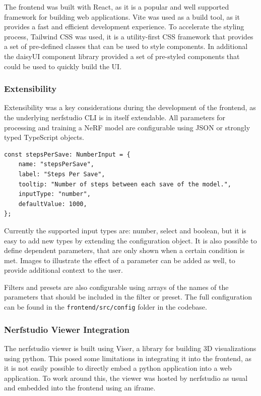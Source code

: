 The frontend was built with React, as it is a popular and well supported framework for building web applications.
Vite was used as a build tool, as it provides a fast and efficient development experience.
To accelerate the styling process, Tailwind CSS was used, it is a utility-first CSS framework that provides a set of pre-defined classes that can be used to style components.
In additional the daisyUI component library provided a set of pre-styled components that could be used to quickly build the UI.

\subsubsection{Extensibility}

Extensibility was a key considerations during the development of the frontend, as the underlying nerfstudio CLI is in itself extendable.
All parameters for processing and training a NeRF model are configurable using JSON or strongly typed TypeScript objects.

\begin{lstlisting}[caption=Parameter Option configuration]
const stepsPerSave: NumberInput = {
	name: "stepsPerSave",
	label: "Steps Per Save",
	tooltip: "Number of steps between each save of the model.",
	inputType: "number",
	defaultValue: 1000,
};
\end{lstlisting}

Currently the supported input types are: number, select and boolean, but it is easy to add new types by extending the configuration object. 
It is also possible to define dependent parameters, that are only shown when a certain condition is met.
Images to illustrate the effect of a parameter can be added as well, to provide additional context to the user.

Filters and presets are also configurable using arrays of the names of the parameters that should be included in the filter or preset.
The full configuration can be found in the \texttt{frontend/src/config} folder in the codebase.

\subsubsection{Nerfstudio Viewer Integration}

The nerfstudio viewer is built using Viser, a library for building 3D visualizations using python.
This posed some limitations in integrating it into the frontend, as it is not easily possible to directly embed a python application into a web application.
To work around this, the viewer was hosted by nerfstudio as usual and embedded into the frontend using an iframe.

